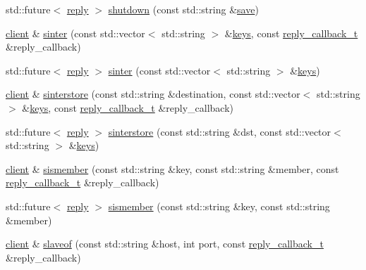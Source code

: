 \begin{DoxyCompactItemize}
\item 
std\+::future$<$ \hyperlink{classcpp__redis_1_1reply}{reply} $>$ \hyperlink{classcpp__redis_1_1client_a8587aeb1044e85ae580cd9661ea826dc}{shutdown} (const std\+::string \&\hyperlink{classcpp__redis_1_1client_a01987f9fb419cfbce81872be8cd17619}{save})
\item 
\hyperlink{classcpp__redis_1_1client}{client} \& \hyperlink{classcpp__redis_1_1client_a67a96ae85449a4dfa6e8976666562be1}{sinter} (const std\+::vector$<$ std\+::string $>$ \&\hyperlink{classcpp__redis_1_1client_acb7845a206b2321e6919c2f38282c322}{keys}, const \hyperlink{classcpp__redis_1_1client_a061a1140d36d2eaeda82b09a0bb3f9f2}{reply\+\_\+callback\+\_\+t} \&reply\+\_\+callback)
\item 
std\+::future$<$ \hyperlink{classcpp__redis_1_1reply}{reply} $>$ \hyperlink{classcpp__redis_1_1client_a069df07b6b3f18f5b2c215c67161c115}{sinter} (const std\+::vector$<$ std\+::string $>$ \&\hyperlink{classcpp__redis_1_1client_acb7845a206b2321e6919c2f38282c322}{keys})
\item 
\hyperlink{classcpp__redis_1_1client}{client} \& \hyperlink{classcpp__redis_1_1client_a55f1722f17eaaa255196851efb0bdb93}{sinterstore} (const std\+::string \&destination, const std\+::vector$<$ std\+::string $>$ \&\hyperlink{classcpp__redis_1_1client_acb7845a206b2321e6919c2f38282c322}{keys}, const \hyperlink{classcpp__redis_1_1client_a061a1140d36d2eaeda82b09a0bb3f9f2}{reply\+\_\+callback\+\_\+t} \&reply\+\_\+callback)
\item 
std\+::future$<$ \hyperlink{classcpp__redis_1_1reply}{reply} $>$ \hyperlink{classcpp__redis_1_1client_aa105a26578624af221f16675c0fbfc55}{sinterstore} (const std\+::string \&dst, const std\+::vector$<$ std\+::string $>$ \&\hyperlink{classcpp__redis_1_1client_acb7845a206b2321e6919c2f38282c322}{keys})
\item 
\hyperlink{classcpp__redis_1_1client}{client} \& \hyperlink{classcpp__redis_1_1client_a369fb068437dfb3f63091d031174cc19}{sismember} (const std\+::string \&key, const std\+::string \&member, const \hyperlink{classcpp__redis_1_1client_a061a1140d36d2eaeda82b09a0bb3f9f2}{reply\+\_\+callback\+\_\+t} \&reply\+\_\+callback)
\item 
std\+::future$<$ \hyperlink{classcpp__redis_1_1reply}{reply} $>$ \hyperlink{classcpp__redis_1_1client_af4ba6bfa37b81759324c726ef77acdbc}{sismember} (const std\+::string \&key, const std\+::string \&member)
\item 
\hyperlink{classcpp__redis_1_1client}{client} \& \hyperlink{classcpp__redis_1_1client_a5a8ff87da211196ca80a7c4badb0c378}{slaveof} (const std\+::string \&host, int port, const \hyperlink{classcpp__redis_1_1client_a061a1140d36d2eaeda82b09a0bb3f9f2}{reply\+\_\+callback\+\_\+t} \&reply\+\_\+callback)

\end{DoxyCompactItemize}
